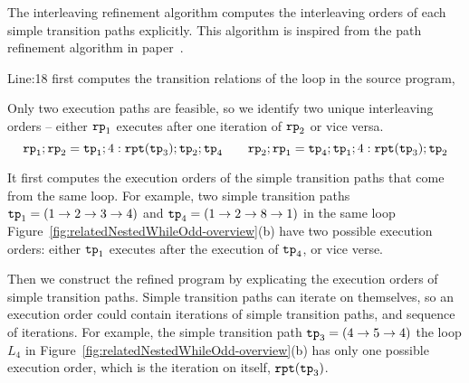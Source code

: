 The interleaving refinement algorithm computes the interleaving orders of each simple transition paths explicitly.
This algorithm is inspired from the path refinement algorithm in paper~\cite{GulwaniJK09}. 

Line:18 first computes the transition relations of the loop in the source program,


Only two execution paths are feasible, so we identify two unique interleaving orders --
either $\mathtt{rp}_1$ executes after one iteration of $\mathtt{rp}_2$ or vice versa.
\[
   \mathtt{rp}_1 ; \mathtt{rp}_2 = \mathtt{tp}_1; 4:\mathtt{rpt}(\mathtt{tp}_3); \mathtt{tp}_2; \mathtt{tp}_4
   \qquad
   \mathtt{rp}_2 ; \mathtt{rp}_1 = \mathtt{tp}_4; \mathtt{tp}_1; 4:\mathtt{rpt}(\mathtt{tp}_3); \mathtt{tp}_2
\]


It first computes the execution orders of
the simple transition paths that come from the same loop.
For example, two simple transition paths $\mathtt{tp}_1 = (1 \to 2 \to 3 \to 4)$ and 
$\mathtt{tp}_4 = (1 \to 2 \to 8 \to 1)$ in the same loop Figure~\ref{fig:relatedNestedWhileOdd-overview}(b) have two possible execution orders:
either $\mathtt{tp}_1$ executes after the execution of $\mathtt{tp}_4$, or vice verse.

Then we construct the refined program by explicating the execution orders of simple transition paths.
Simple transition paths can iterate on themselves, so an execution order could
contain iterations of simple transition paths, and sequence of iterations.
For example, the simple transition path $\mathtt{tp}_3 = (4 \to 5 \to 4)$
the loop $L_4$ in Figure~\ref{fig:relatedNestedWhileOdd-overview}(b) has only one possible execution order,
which is the iteration on itself, $\mathtt{rpt}(\mathtt{tp}_3)$.

